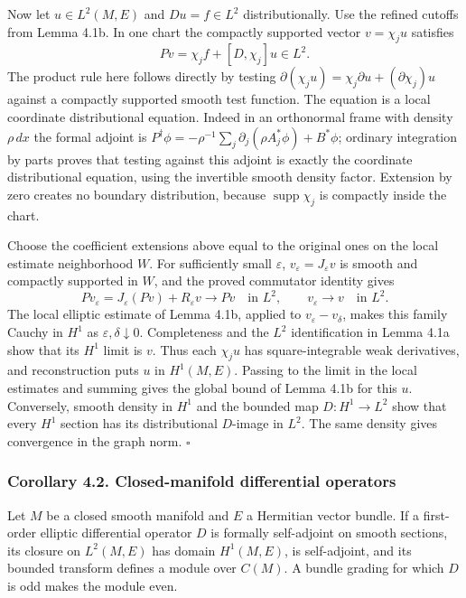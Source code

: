 \documentclass[
  11pt,
]{article}
\begin{document}
Now let \(u\in L^2(M,E)\) and \(Du=f\in L^2\) distributionally. Use the
refined cutoffs from Lemma 4.1b. In one chart the compactly supported
vector \(v=\chi_ju\) satisfies \[
Pv=\chi_jf+[D,\chi_j]u\in L^2 .
\] The product rule here follows directly by testing
\(\partial(\chi_ju)=\chi_j\partial u+(\partial\chi_j)u\) against a
compactly supported smooth test function. The equation is a local
coordinate distributional equation. Indeed in an orthonormal frame with
density \(\rho\,dx\) the formal adjoint is
\(P^\dagger\phi=-\rho^{-1}\sum_j\partial_j(\rho A_j^*\phi)+B^*\phi\);
ordinary integration by parts proves that testing against this adjoint
is exactly the coordinate distributional equation, using the invertible
smooth density factor. Extension by zero creates no boundary
distribution, because \(\operatorname{supp}\chi_j\) is compactly inside
the chart.

Choose the coefficient extensions above equal to the original ones on
the local estimate neighborhood \(W\). For sufficiently small
\(\varepsilon\), \(v_\varepsilon=J_\varepsilon v\) is smooth and
compactly supported in \(W\), and the proved commutator identity gives
\[
Pv_\varepsilon=J_\varepsilon(Pv)+R_\varepsilon v
\longrightarrow Pv\quad\text{in }L^2,
\qquad v_\varepsilon\longrightarrow v\quad\text{in }L^2 .
\] The local elliptic estimate of Lemma 4.1b, applied to
\(v_\varepsilon-v_\delta\), makes this family Cauchy in \(H^1\) as
\(\varepsilon,\delta\downarrow0\). Completeness and the \(L^2\)
identification in Lemma 4.1a show that its \(H^1\) limit is \(v\). Thus
each \(\chi_ju\) has square-integrable weak derivatives, and
reconstruction puts \(u\) in \(H^1(M,E)\). Passing to the limit in the
local estimates and summing gives the global bound of Lemma 4.1b for
this \(u\). Conversely, smooth density in \(H^1\) and the bounded map
\(D:H^1\to L^2\) show that every \(H^1\) section has its distributional
\(D\)-image in \(L^2\). The same density gives convergence in the graph
norm. \(\square\)

\subsubsection{Corollary 4.2. Closed-manifold differential
operators}\label{corollary-4.2.-closed-manifold-differential-operators}

Let \(M\) be a closed smooth manifold and \(E\) a Hermitian vector
bundle. If a first-order elliptic differential operator \(D\) is
formally self-adjoint on smooth sections, its closure on \(L^2(M,E)\)
has domain \(H^1(M,E)\), is self-adjoint, and its bounded transform
defines a module over \(C(M)\). A bundle grading for which \(D\) is odd
makes the module even.
\end{document}
